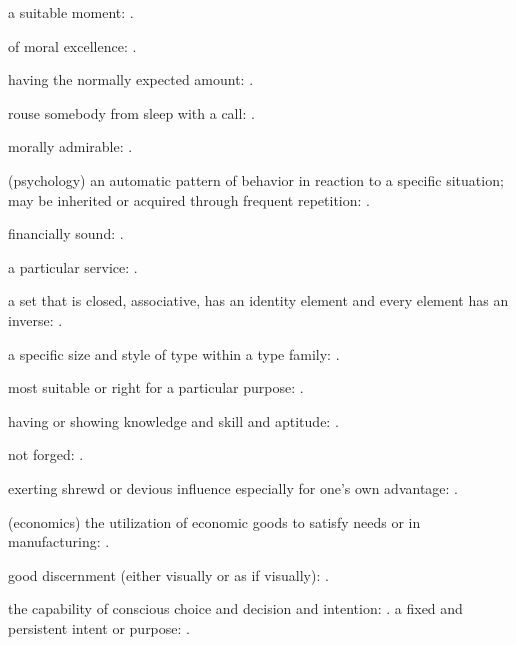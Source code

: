  a suitable moment: .

  of moral excellence:   .

  having the normally expected amount:   .

  rouse somebody from sleep with a call: .

  morally admirable: .

  (psychology) an automatic pattern of behavior in reaction to a specific situation; may be inherited or acquired through frequent repetition:   .

  financially sound:   .

  a particular service: .

  a set that is closed, associative, has an identity element and every element has an inverse:   .

  a specific size and style of type within a type family:   .

  most suitable or right for a particular purpose:   .

  having or showing knowledge and skill and aptitude:   .

  not forged:   .

  exerting shrewd or devious influence especially for one's own advantage:   .

  (economics) the utilization of economic goods to satisfy needs or in manufacturing:   .

  good discernment (either visually or as if visually): .

  the capability of conscious choice and decision and intention:   . a fixed and persistent intent or purpose: .

